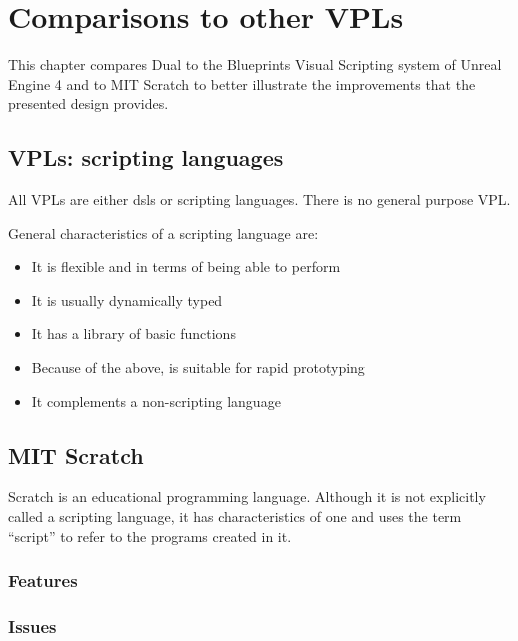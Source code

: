 \chapter{Comparisons to other VPLs}\label{chap:comp}
This chapter compares Dual to the Blueprints Visual Scripting system of Unreal Engine 4 and to MIT Scratch to better illustrate the improvements that the presented design provides.

\section{VPLs: scripting languages}
All VPLs are either \acrshort{dsl}s or scripting languages. There is no general purpose VPL\cite{general_vpl, no_general_vpl_hacker_news}.

General characteristics of a scripting language are\cite{scripting_langs, scripting_lang_wikipedia, c2_scripting_lang, perl_scripting}:
\begin{itemize}
    \item It is flexible and in terms of being able to perform
    \item It is usually dynamically typed
    \item It has a library of basic functions
    \item Because of the above, is suitable for rapid prototyping
    \item It complements a non-scripting language
\end{itemize}

\section{MIT Scratch}
Scratch is an educational programming language. Although it is not explicitly called a scripting language, it has characteristics of one and uses the term ``script'' to refer to the programs created in it\cite{script_scratch_wiki}.

\subsection{Features}

\subsection{Issues}

